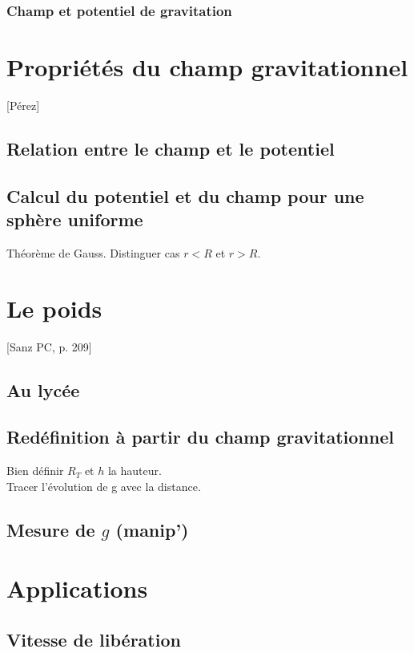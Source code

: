 \documentclass[11pt]{report}
\numberwithin{figure}{section}
\numberwithin{equation}{section}
\numberwithin{table}{section}
\newcommand{\1}{\boldsymbol{1}}
\begin{document}
\subsubsection{Champ et potentiel de gravitation}

\section{Propriétés du champ gravitationnel}

[Pérez]

\subsection{Relation entre le champ et le potentiel}

\subsection{Calcul du potentiel et du champ pour une sphère uniforme}

Théorème de Gauss. Distinguer cas $r<R$ et $r>R$.

\section{Le poids}

[Sanz PC, p. 209]

\subsection{Au lycée}

\subsection{Redéfinition à partir du champ gravitationnel}

Bien définir $R_T$ et $h$ la hauteur. \\
Tracer l'évolution de g avec la distance.

\subsection{Mesure de $g$ (manip')}


\section{Applications}

\subsection{Vitesse de libération}
\end{document}
